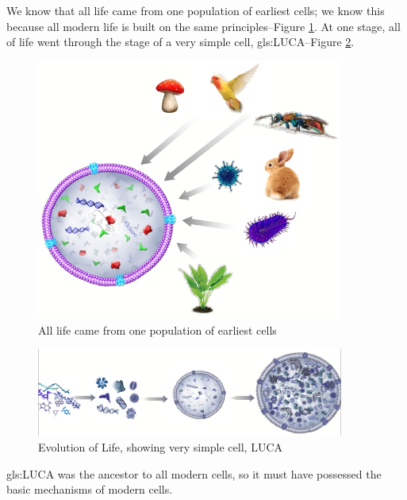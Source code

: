 \documentclass[]{article}
\begin{document}
We know that all life came from one population of earliest cells; we know this because all modern life is built on the same principles--Figure \ref{fig:ModernCell}. At one stage, all of life went through the stage of a very simple cell, \gls{gls:LUCA}--Figure \ref{fig:EvolCell}.

\begin{figure}[H]
	\caption{All life came from one population of earliest cells}\label{fig:ModernCell}
	\includegraphics[width=0.9\textwidth]{ModernCell}
\end{figure}

\begin{figure}[H]
	\caption{Evolution of Life, showing very simple cell, LUCA}\label{fig:EvolCell}
	\includegraphics[width=0.9\textwidth]{EvolCell}
\end{figure}

\gls{gls:LUCA} was the ancestor to all modern cells, so it must have possessed the basic mechanisms of  modern cells.
\end{document}
